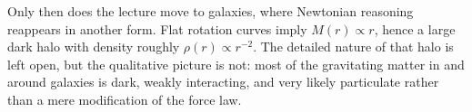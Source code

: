 Only then does the lecture move to galaxies, where Newtonian reasoning reappears in another form. Flat rotation curves imply \(M(r)\propto r\), hence a large dark halo with density roughly \(\rho(r)\propto r^{-2}\). The detailed nature of that halo is left open, but the qualitative picture is not: most of the gravitating matter in and around galaxies is dark, weakly interacting, and very likely particulate rather than a mere modification of the force law.